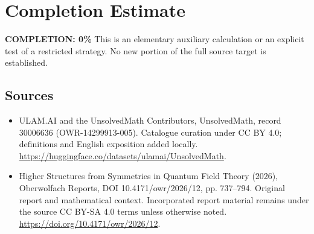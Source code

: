 \documentclass[11pt]{article}
\begin{document}
\section{Completion Estimate}
\noindent\textbf{COMPLETION: 0\%}
This is an elementary auxiliary calculation or an explicit test of a restricted strategy. No new portion of the full source target is established.

\subsection{Sources}
\begin{itemize}
\item[\hypertarget{source:30006636:1}{S1}] ULAM.AI and the UnsolvedMath Contributors, UnsolvedMath, record 30006636 (OWR-14299913-005). Catalogue curation under CC BY 4.0; definitions and English exposition added locally.
\url{https://huggingface.co/datasets/ulamai/UnsolvedMath}.
\item[\hypertarget{source:30006636:2}{S2}] Higher Structures from Symmetries in Quantum Field Theory (2026), Oberwolfach Reports, DOI 10.4171/owr/2026/12, pp. 737--794. Original report and mathematical context. Incorporated report material remains under the source CC BY-SA 4.0 terms unless otherwise noted.
\url{https://doi.org/10.4171/owr/2026/12}.
\end{itemize}
\label{end:30006636}
\end{document}
